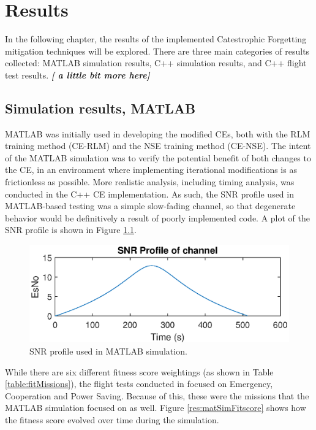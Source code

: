 \chapter{Results}\label{ch:results}

\par In the following chapter, the results of the implemented Catestrophic Forgetting mitigation techniques will be explored. There are three main categories of results collected: MATLAB simulation results, C++ simulation results, and C++ flight test results. \textbf{\textit{[ a little bit more here]}}
\section{Simulation results, MATLAB}
\par MATLAB was initially used in developing the modified CEs, both with the RLM training method (CE-RLM) and the NSE training method (CE-NSE). The intent of the MATLAB simulation was to verify the potential benefit of both changes to the CE, in an environment where implementing iterational modifications is as frictionless as possible. More realistic analysis, including timing analysis, was conducted in the C++ CE implementation. As such, the SNR profile used in MATLAB-based testing was a simple slow-fading channel, so that degenerate behavior would be definitively a result of poorly implemented code. A plot of the SNR profile is shown in Figure \ref{fig:matlabSNRProf}. 

\begin{figure}[ht]
\centering
\includegraphics[scale=1]{figures/matlab_sim_results/snrPRofile_matlabsim.eps}
\caption{SNR profile used in MATLAB simulation.}
\label{fig:matlabSNRProf}
\end{figure}

\par While there are six different fitness score weightings (as shown in Table \ref{table:fitMissions}), the flight tests conducted in \cite{tim_implementation} focused on Emergency, Cooperation and Power Saving. Because of this, these were the missions that the MATLAB simulation focused on as well. Figure \ref{res:matSimFitscore} shows how the fitness score evolved over time during the simulation.

